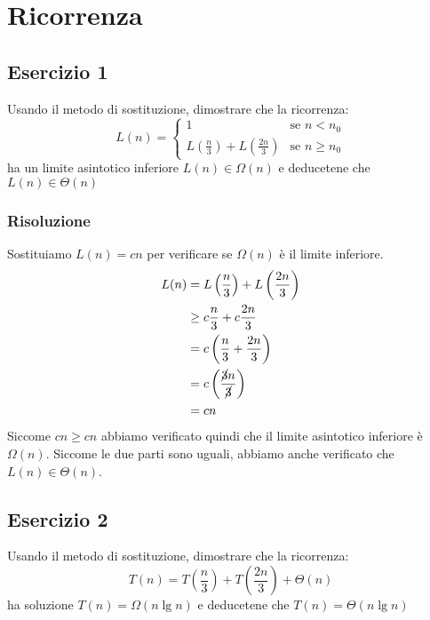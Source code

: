 \documentclass[a4paper]{article}
\begin{document}


\tableofcontents
\pagebreak

\section{Ricorrenza}
\subsection{Esercizio 1}
Usando il metodo di sostituzione, dimostrare che la ricorrenza:
\[
  L(n) = \begin{cases}
    1 & \text{se } n < n_0\\
    L\left(\frac{n}{3}\right) + L\left(\frac{2n}{3}\right) & \text{se } n \ge n_0
  \end{cases}
\] 
ha un limite asintotico inferiore \( L(n) \in \Omega(n) \) e deducetene che 
\( L(n) \in \Theta(n) \) 

\subsubsection{Risoluzione}
Sostituiamo \( L(n) = cn \) per verificare se \( \Omega(n) \) è il limite inferiore.
\[
  \begin{aligned}
    L(n) &= L\left(\frac{n}{3}\right) + L\left(\frac{2n}{3}\right)\\
         &\ge  c \frac{n}{3} + c \frac{2n}{3}\\
         &= c \left( \frac{n}{3} + \frac{2n}{3} \right) \\
         &= c \left( \frac{\cancel{3}n}{\cancel{3}} \right) \\
         &= cn
  \end{aligned}
\] 
Siccome \( cn \ge cn \) abbiamo verificato quindi che il limite asintotico inferiore è
\( \Omega(n) \). Siccome le due parti sono uguali, abbiamo anche verificato che
\( L(n) \in \Theta(n) \).

\subsection{Esercizio 2}
Usando il metodo di sostituzione, dimostrare che la ricorrenza:
\[
  T(n) = T\left(\frac{n}{3}\right) + T\left(\frac{2n}{3}\right) + \Theta(n)
\] 
ha soluzione \( T(n) = \Omega(n \lg n) \) e deducetene che \( T(n) = \Theta(n \lg n) \) 
\end{document}

